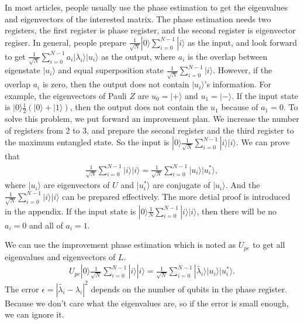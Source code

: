 \documentclass[onecolumn,notitlepage]{revtex4-1}
\def\ket#1{| #1 \rangle}
\begin{document}
In most articles, people usually use the phase estimation to get the eigenvalues and eigenvectors of the interested matrix. 
The phase estimation needs two registers, the first register is phase register, and the second register is eigenvector regiser. 
In general, people prepare $\frac{1}{\sqrt{N}}\ket{0}\sum_{i=0}^{N-1}\ket{i}$ as the input, and look forward to get $\frac{1}{\sqrt{N}}\sum_{i=0}^{N-1}a_{i}\ket{\lambda_{i}}\ket{u_{i}}$ as the output, where $a_{i}$ is the overlap between eigenstate $\ket{u_{i}}$ and equal superposition state $\frac{1}{\sqrt{N}}\sum_{i=0}^{N-1}\ket{i}$. 
However, if the overlap $a_{i}$ is zero, then the output does not contain $\ket{u_{i}}$'s information. 
For example, the eigenvectors of Pauli $Z$ are $u_{0}=\ket{+}$ and $u_{1}=\ket{-}$. 
If the input state is $\ket{0}\frac{1}{2}(\ket{0}+\ket{1})$, then the output does not contain the $u_{1}$ because of $a_{1}=0$. 
To solve this problem, we put forward an improvement plan. 
We increase the number of registers from 2 to 3, and prepare the second register and the third register to the maximum entangled state. 
So the input is $\ket{0}\frac{1}{\sqrt{N}}\sum_{i=0}^{N-1}\ket{i}\ket{i}$. 
We can prove that 
\begin{align}
    \frac{1}{\sqrt{N}}\sum_{i=0}^{N-1}\ket{i}\ket{i}=\frac{1}{\sqrt{N}}\sum_{i=0}^{N-1}\ket{u_{i}}\ket{u_{i}^{*}},
\end{align}
where $\ket{u_{i}}$ are eigenvectors of $U$ and $\ket{u_{i}^{*}}$ are conjugate of $\ket{u_{i}}$. And the $\frac{1}{\sqrt{N}}\sum_{i=0}^{N-1}\ket{i}\ket{i}$ can be prepared effectively.
The more detial proof is introduced in the appendix.
If the input state is $\ket{0}\frac{1}{N}\sum_{i=0}^{N-1}\ket{i}\ket{i}$, then there will be no $a_{i}=0$ and all of $a_{i}=1$.

We can use the improvement phase estimation which is noted as $U_{pe}$ to get all eigenvalues and eigenvectors of $L$.
\begin{align}
    U_{pe}\ket{0}\frac{1}{\sqrt{N}}\sum_{i=0}^{N-1}\ket{i}\ket{i}=\frac{1}{\sqrt{N}}\sum_{i=0}^{N-1}\ket{\tilde{\lambda_{i}}}\ket{u_{i}}\ket{u_{i}^{*}}.
\end{align}
The error $\epsilon=|\tilde{\lambda_{i}}-\lambda_{i}|^{2}$ depends on the number of qubits in the phase register. Because we don't care what the eigenvalues are, so if the error is small enough, we can ignore it. 
\end{document}
